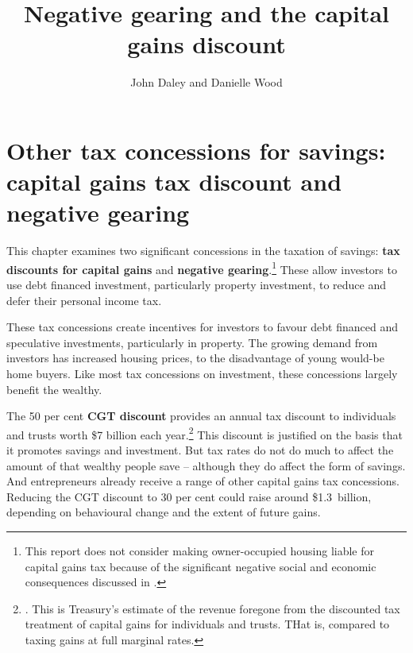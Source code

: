 \documentclass{grattan}\usepackage[]{graphicx}\usepackage[]{color}
\title{Negative gearing and the capital gains discount}
\author{John Daley and Danielle Wood}
\newcommand{\highlight}[1]{\textbf{#1}}
\begin{document}
\clearpage


\raggedbottom
\setcounter{tocdepth}{1}
\contentspage














\chapter{Other tax concessions for savings: capital gains tax discount and negative gearing}
This chapter examines two significant concessions in the taxation of savings: \highlight{tax discounts for capital gains} and \highlight{negative gearing}.\footnote{This report does not consider making owner-occupied housing liable for capital gains tax because of the significant negative social and economic consequences discussed in \textcite[pp.~43-45]{Daley2013}.}  These allow investors to use debt financed investment, particularly property investment, to reduce and defer their personal income tax.

These tax concessions create incentives for investors to favour debt financed and speculative investments, particularly in property. The growing demand from investors has increased housing prices, to the disadvantage of young would-be home buyers. Like most tax concessions on investment, these concessions largely benefit the wealthy. 

The 50 per cent \highlight{CGT discount} provides an annual tax discount to individuals and trusts worth \$7 billion each year.\footnote{\textcite[p.4-21]{Treasury2015a}. This is Treasury's estimate of the revenue foregone from the discounted tax treatment of capital gains for individuals and trusts. THat is, compared to taxing gains at full marginal rates.} This discount is justified on the basis that it promotes savings and investment. But tax rates do not do much to affect the amount of that wealthy people save -- although they do affect the form of savings. And entrepreneurs already receive a range of other capital gains tax concessions. Reducing the CGT discount to 30 per cent could raise around \$1.3~billion, depending on behavioural change and the extent of future gains.
\end{document}
